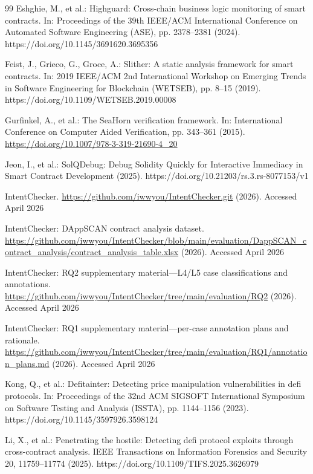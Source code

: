 \documentclass[pdflatex,sn-basic]{sn-jnl}%
\theoremstyle{thmstyleone}%
\theoremstyle{thmstyletwo}%
\theoremstyle{thmstylethree}%
\begin{document}
\begin{thebibliography}{99}
Eshghie, M., et al.: Highguard: Cross-chain business logic monitoring of smart contracts. In: Proceedings of the 39th IEEE/ACM International Conference on Automated Software Engineering (ASE), pp. 2378--2381 (2024). https://doi.org/10.1145/3691620.3695356

Feist, J., Grieco, G., Groce, A.: Slither: A static analysis framework for smart contracts. In: 2019 IEEE/ACM 2nd International Workshop on Emerging Trends in Software Engineering for Blockchain (WETSEB), pp. 8--15 (2019). https://doi.org/10.1109/WETSEB.2019.00008

Gurfinkel, A., et al.: The SeaHorn verification framework. In: International Conference on Computer Aided Verification, pp. 343--361 (2015). \url{https://doi.org/10.1007/978-3-319-21690-4_20}

Jeon, I., et al.: SolQDebug: Debug Solidity Quickly for Interactive Immediacy in Smart Contract Development (2025). https://doi.org/10.21203/rs.3.rs-8077153/v1

IntentChecker. \url{https://github.com/iwwyou/IntentChecker.git} (2026). Accessed April 2026

IntentChecker: DAppSCAN contract analysis dataset. \url{https://github.com/iwwyou/IntentChecker/blob/main/evaluation/DappSCAN_contract_analysis/contract_analysis_table.xlsx} (2026). Accessed April 2026

IntentChecker: RQ2 supplementary material---L4/L5 case classifications and annotations. \url{https://github.com/iwwyou/IntentChecker/tree/main/evaluation/RQ2} (2026). Accessed April 2026

IntentChecker: RQ1 supplementary material---per-case annotation plans and rationale. \url{https://github.com/iwwyou/IntentChecker/tree/main/evaluation/RQ1/annotation_plans.md} (2026). Accessed April 2026

Kong, Q., et al.: Defitainter: Detecting price manipulation vulnerabilities in defi protocols. In: Proceedings of the 32nd ACM SIGSOFT International Symposium on Software Testing and Analysis (ISSTA), pp. 1144--1156 (2023). https://doi.org/10.1145/3597926.3598124

Li, X., et al.: Penetrating the hostile: Detecting defi protocol exploits through cross-contract analysis. IEEE Transactions on Information Forensics and Security 20, 11759--11774 (2025). https://doi.org/10.1109/TIFS.2025.3626979


\end{thebibliography}
\end{document}
